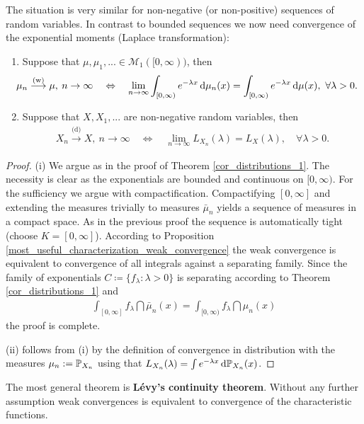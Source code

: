 The situation is very similar for non-negative (or non-positive) sequences of random variables. In contrast to bounded sequences we now need convergence of the exponential moments (Laplace transformation):
\begin{lsatzwichtig}
	\begin{theorem}
		\begin{enumerate}[label=(\roman*)]
			\item Suppose that $\mu,\mu_1,...\in \mathcal M_1([0,\infty))$, then 
		\begin{align*}
		\hspace{-4mm}	\mu_n \overset{\text{(w)}}{\longrightarrow} \mu,\: n \to \infty \quad\Leftrightarrow \quad \lim_{n\to\infty}\int_{[0,\infty)} e^{-\lambda x}\dint \mu_n(x)=\int_{[0,\infty)} e^{-\lambda x}\dint \mu(x),\,\, \forall \lambda >0.
		\end{align*}
		\item Suppose that $X,X_1,...$ are non-negative random variables, then 
		\begin{align*}
			X_n \overset{\text{(d)}}{\longrightarrow} X,\: n \to \infty \quad\Leftrightarrow \quad \lim_{n\to\infty} L_{X_n}(\lambda)=L_X(\lambda), \quad\forall \lambda>0.
		\end{align*}
	\end{enumerate}
	\end{theorem}
	\end{lsatzwichtig}
	\begin{proof}[Proof]
		(i) We argue as in the proof of Theorem \ref{cor_distributions_1}. The necessity is clear as the exponentials are bounded and continuous on $[0,\infty)$. For the sufficiency we argue with compactification. Compactifying $[0,\infty]$ and extending the measures trivially to measures $\bar \mu_n$ yields a sequence of measures in a compact space. As in the previous proof the sequence is automatically tight (choose $K=[0,\infty]$). 
		According to Proposition \ref{most_useful_characterization_weak_convergence} the weak convergence is equivalent to convergence of all integrals against a separating family. Since the family of exponentials $C\coloneqq \{ f_{\lambda} \colon \lambda > 0 \}$ is separating according to Theorem \ref{cor_distributions_1} and 
		\begin{align*}
			\int_{[0,\infty]} f_\lambda \dint \bar\mu_n(x)=\int_{[0,\infty)} f_\lambda \dint \mu_n(x)
		\end{align*}		
		the proof is complete.\smallskip

		(ii) follows from (i) by the definition of convergence in distribution with the measures $\mu_n:=\P_{X_n}$ using that $L_{X_n}(\lambda)=\int e^{-\lambda x} \dint \P_{X_n}(x)$.\smallskip
	\end{proof}
The most general theorem is \textbf{L\'evy's continuity theorem}. Without any further assumption weak convergences is equivalent to convergence of the characteristic functions. 

